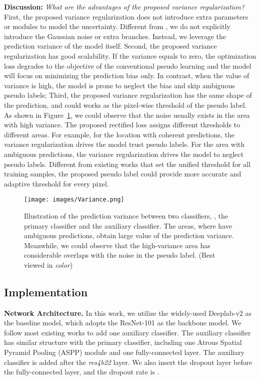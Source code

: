 \noindent\textbf{Discussion:} \emph{What are the advantages of the proposed variance regularization?} 
First, the proposed variance regularization does not introduce extra parameters or modules to model the uncertainty. Different from \cite{yu2019robust}, we do not explicitly introduce the Gaussian noise or extra branches. Instead, we leverage the prediction variance of the model itself. Second, the proposed variance regularization has good scalability.
If the variance equals to zero, the optimization loss degrades to the objective of the conventional pseudo learning and the model will focus on minimizing the prediction bias only. In contrast, when the value of variance is high, the model is prone to neglect the bias and skip ambiguous pseudo labels; 
Third, the proposed variance regularization has the same shape of the prediction, and could works as the pixel-wise threshold of the pseudo label. As shown in Figure~\ref{fig:variance}, we could observe that the noise usually exists in the area with high variance. The proposed rectified loss assigns different thresholds to different areas. For example, for the location with coherent predictions, the variance regularization drives the model trust pseudo labels. For the area with ambiguous predictions, the variance regularization drives the model to neglect pseudo labels. Different from existing works that set the unified threshold for all training samples, the proposed pseudo label could provide more accurate and adaptive threshold for every pixel.  

\begin{figure}[t]
\begin{center}
     \texttt{[image: images/Variance.png]}
\end{center} 
      \caption{ Illustration of the prediction variance between two classifiers, \ie, the primary classifier and the auxiliary classifier. The areas, where have ambiguous predictions, obtain large value of the prediction variance. Meanwhile, we could observe that the high-variance area has considerable overlaps with the noise in the pseudo label. (Best viewed in \emph{color}) }
      \label{fig:variance}
\end{figure}

\subsection{Implementation} \label{sec:detail}
\noindent\textbf{Network Architecture.} In this work, we utilize the widely-used Deeplab-v2 \cite{chen2017deeplab} as the baseline model, which adopts the ResNet-101 \cite{he2016deep} as the backbone model. We follow most existing works \cite{tsai2018learning,tsai2019domain,luo2019significance,luo2019taking,zheng2019unsupervised} to add one auxiliary classifier. The auxiliary classifier has similar structure with the primary classifier, including one Atrous Spatial Pyramid Pooling (ASPP) module \cite{chen2017deeplab} and one fully-connected layer. The auxiliary classifier is added after the \emph{res4b22} layer. We also insert the dropout layer \cite{srivastava2014dropout} before the fully-connected layer, and the dropout rate is . 

